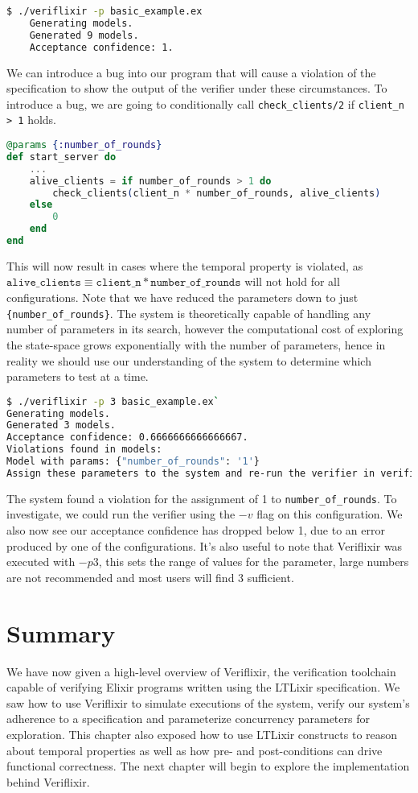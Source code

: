 \begin{lstlisting}[language=bash, xleftmargin=.1\linewidth]
    $ ./veriflixir -p basic_example.ex 
    Generating models.
    Generated 9 models.
    Acceptance confidence: 1.
\end{lstlisting}
We can introduce a bug into our program that will cause a violation of the specification to show the output of the verifier under these circumstances. To introduce a bug, we are going to conditionally call \texttt{check\_clients/2} if \texttt{client\_n > 1} holds.
\begin{lstlisting}[language=Elixir, xleftmargin=.1\linewidth]
@params {:number_of_rounds}
def start_server do
    ...
    alive_clients = if number_of_rounds > 1 do
        check_clients(client_n * number_of_rounds, alive_clients)
    else
        0
    end
end
\end{lstlisting}
This will now result in cases where the temporal property is violated, as $\texttt{alive\_clients} \equiv \texttt{client\_n} * \texttt{number\_of\_rounds}$ will not hold for all configurations. Note that we have reduced the parameters down to just \texttt{\{number\_of\_rounds\}}. The system is theoretically capable of handling any number of parameters in its search, however the computational cost of exploring the state-space grows exponentially with the number of parameters, hence in reality we should use our understanding of the system to determine which parameters to test at a time.
\begin{lstlisting}[language=bash, xleftmargin=.1\linewidth]
$ ./veriflixir -p 3 basic_example.ex`
Generating models.
Generated 3 models.
Acceptance confidence: 0.6666666666666667.
Violations found in models:
Model with params: {"number_of_rounds": '1'}
Assign these parameters to the system and re-run the verifier in verification mode to gather a trace.
\end{lstlisting}
The system found a violation for the assignment of 1 to \texttt{number\_of\_rounds}. To investigate, we could run the verifier using the $-v$ flag on this configuration. We also now see our acceptance confidence has dropped below 1, due to an error produced by one of the configurations. It's also useful to note that Veriflixir was executed with $-p 3$, this sets the range of values for the parameter, large numbers are not recommended and most users will find 3 sufficient. 
\section{Summary}
We have now given a high-level overview of Veriflixir, the verification toolchain capable of verifying Elixir programs written using the LTLixir specification. We saw how to use Veriflixir to simulate executions of the system, verify our system's adherence to a specification and parameterize concurrency parameters for exploration. This chapter also exposed how to use LTLixir constructs to reason about temporal properties as well as how pre- and post-conditions can drive functional correctness. The next chapter will begin to explore the implementation behind Veriflixir.